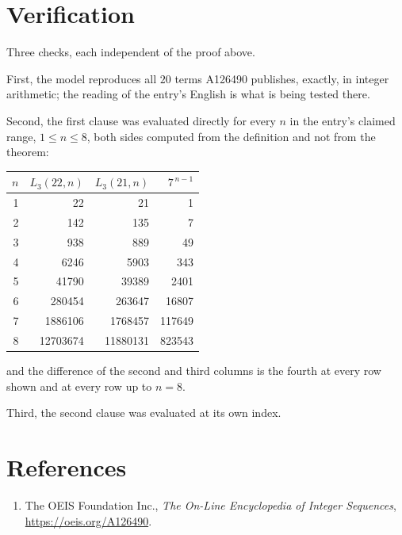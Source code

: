 \documentclass[11pt,a4paper]{article}
\theoremstyle{plain}
\theoremstyle{definition}
\begin{document}
\section{Verification}

Three checks, each independent of the proof above.

First, the model reproduces all $20$ terms A126490 publishes, exactly, in integer
arithmetic; the reading of the entry's English is what is being tested there.

Second, the first clause was evaluated directly for every $n$ in the entry's claimed range,
$1\le n\le8$, both sides computed from the definition and not from the theorem:

\begin{center}
\begin{tabular}{rrrr}
$n$ & $L_{3}(22,n)$ & $L_{3}(21,n)$ & $7^{\,n-1}$ \\ \hline
1 & 22 & 21 & 1 \\
2 & 142 & 135 & 7 \\
3 & 938 & 889 & 49 \\
4 & 6246 & 5903 & 343 \\
5 & 41790 & 39389 & 2401 \\
6 & 280454 & 263647 & 16807 \\
7 & 1886106 & 1768457 & 117649 \\
8 & 12703674 & 11880131 & 823543 \\
\end{tabular}
\end{center}

\noindent and the difference of the second and third columns is the fourth at every row shown
and at every row up to $n=8$.

Third, the second clause was evaluated at its own index.

\section*{References}
\begin{enumerate}
\item The OEIS Foundation Inc., \emph{The On-Line Encyclopedia of Integer Sequences},
\url{https://oeis.org/A126490}.
\end{enumerate}
\end{document}
